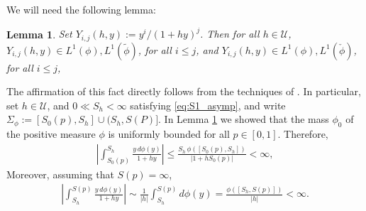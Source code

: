 \documentclass[jmp,graphicx]{revtex4-1}
\newtheorem{lemma}{Lemma}[section]
\begin{document}
We will need the following lemma:
\begin{lemma}\label{lem:h_diff_commutation}  
  Set $Y_{i,j}(h,y):=y^i/(1+hy)^j$. Then for all $h\in\mathcal{U}$,
  $Y_{i,j}(h,y)\in L^1(\phi),L^1(\tilde{\phi})$, for all $i\leq j$, and
  $Y_{i,j}(h,y)\in L^1(\phi),L^1(\check{\phi})$, for all $i\leq j$,   
\end{lemma}
%

The affirmation of this fact
directly follows from the techniques of . In particular, set
$h\in\mathcal{U}$, 
and $0\ll S_h<\infty$ satisfying \eqref{eq:S1_asymp}, and write
$\Sigma_\phi:=[S_0(p),S_h]\cup(S_h,S(P)]$. In Lemma 
\ref{lem:h_diff_commutation} we showed that the mass $\phi_0$ of the
positive measure $\phi$ is uniformly bounded for all $p\in[0,1]$. Therefore,
%
\begin{align}\label{eq:L1(y_phi)_bound_finite_set}
 \left| \int_{S_0(p)}^{S_h}\frac{y\,d\phi(y)}{1+hy}\right|\leq
  \frac{S_h\,\phi([S_0(p),S_h])}{|1+hS_0(p)|}<\infty,
\end{align}
%
Moreover, assuming that $S(p)=\infty$,  
%
\begin{align}
 \left|\int_{S_h}^{S(p)}\frac{y\,d\phi(y)}{1+hy}\right|
     \sim\frac{1}{|h|}\int_{S_h}^{S(p)} d\phi(y)
     =\frac{\phi([S_h,S(p)])}{|h|}<\infty.
\end{align}
%
\end{document}

